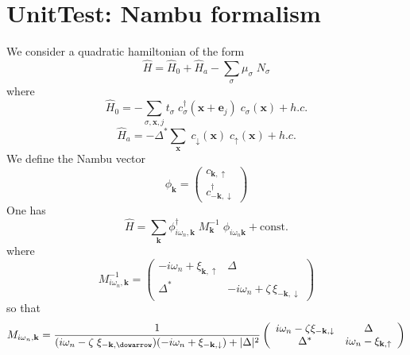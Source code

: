 \documentclass{article}
\begin{document}
\section{UnitTest: Nambu formalism}
We consider a quadratic hamiltonian of the form
$$
\hat{H} = \hat{H}_0 + \hat{H}_a - \sum_\sigma \mu_\sigma \; N_\sigma
$$
where
$$
\hat{H}_0  = -\sum_{\sigma,\mathbf{x},j} t_{\sigma} \;c^\dagger_{\sigma}(\mathbf{x}+\mathbf{e}_j)\;c_{\sigma}(\mathbf{x}) +h.c.
$$
$$
\hat{H}_a  = -\Delta^*\sum_{\mathbf{x}}  \;c_{\downarrow}(\mathbf{x})\;c_{\uparrow}(\mathbf{x}) +h.c.
$$
We define the Nambu vector
$$
\phi_{\mathbf{k}} = \left(\begin{array}{c}c_{\mathbf{k},\uparrow} \\ c_{-\mathbf{k},\downarrow}^\dagger\end{array}\right)
  $$
  One has
  $$
  \hat{H} = \sum_{\mathbf{k}} \phi_{i\omega_n,\mathbf{k}}^\dagger \;M_{\mathbf{k}}^{-1}\;\phi_{i\omega_n\mathbf{k}}+ \text{const.}
$$
where
$$
M_{i\omega_n,\mathbf{k}}^{-1}=\left(\begin{array}{cc}-i\omega_n+\xi_{\mathbf{k},\uparrow} & \Delta\\
\Delta^* & -i\omega_n+\zeta\, \xi_{-\mathbf{k},\downarrow}\end{array}\right)
$$
so that
$$
M_{i\omega_n,\mathbf{k}}=\frac{1}{(i\omega_n-\zeta\;\xi_{-\mathbf{k},\dowarrow})(-i\omega_n+\xi_{-\mathbf{k},\downarrow})+|\Delta|^2}\left(\begin{array}{cc}i\omega_n-\zeta\xi_{-\mathbf{k},\downarrow} & \Delta\\
\Delta^* &  i\omega_n-\xi_{\mathbf{k},\uparrow}\end{array}\right)
$$
\end{document}
